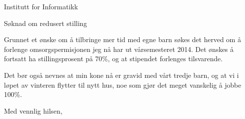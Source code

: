 \documentclass{letter}
\begin{document}
\begin{letter}{Institutt for Informatikk}

\opening{Søknad om redusert stilling}

Grunnet et ønske om å tilbringe mer tid med egne barn søkes det herved
om å forlenge omsorgspermisjonen jeg nå har ut vårsemesteret 2014. Det
ønskes å fortsatt ha stillingsprosent på 70\%, og at stipendet
forlenges tilsvarende.

Det bør også nevnes at min kone nå er gravid med vårt tredje barn, og
at vi i løpet av vinteren flytter til nytt hus, noe som gjør det meget
vanskelig å jobbe 100\%.

\closing{Med vennlig hilsen,}


\end{letter}
\end{document}
